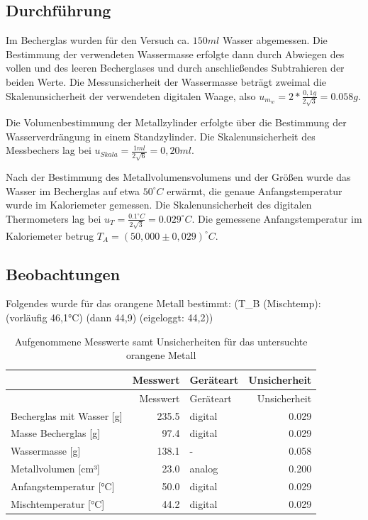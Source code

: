 \documentclass[
  9pt,
]{article}
\begin{document}
\hypertarget{durchfuxfchrung}{%
\subsection{Durchführung}\label{durchfuxfchrung}}

Im Becherglas wurden für den Versuch ca. \(150ml\) Wasser abgemessen.
Die Bestimmung der verwendeten Wassermasse erfolgte dann durch Abwiegen
des vollen und des leeren Becherglases und durch anschließendes
Subtrahieren der beiden Werte. Die Messunsicherheit der Wassermasse
beträgt zweimal die Skalenunsicherheit der verwendeten digitalen Waage,
also \(u_{m_w}=2*\frac{0,1g}{2\sqrt{3}}=0.058g\).

Die Volumenbestimmung der Metallzylinder erfolgte über die Bestimmung
der Wasserverdrängung in einem Standzylinder. Die Skalenunsicherheit des
Messbechers lag bei \(u_{Skala}=\frac{1ml}{2\sqrt{6}}=0,20ml\).

Nach der Bestimmung des Metallvolumensvolumens und der Größen wurde das
Wasser im Becherglas auf etwa \(50^\circ C\) erwärmt, die genaue
Anfangstemperatur wurde im Kaloriemeter gemessen. Die Skalenunsicherheit
des digitalen Thermometers lag bei
\(u_T = \frac{0.1^\circ C}{2\sqrt{3}} = 0.029^\circ C\). Die gemessene
Anfangstemperatur im Kaloriemeter betrug
\(T_A=(50,000\pm 0,029)^\circ C\).

\hypertarget{beobachtungen-1}{%
\subsection{Beobachtungen}\label{beobachtungen-1}}

Folgendes wurde für das orangene Metall bestimmt: (T\_B (Mischtemp):
(vorläufig 46,1°C) (dann 44,9) (eigeloggt: 44,2))

\begin{longtable}[]{@{}lrlr@{}}
\caption{Aufgenommene Messwerte samt Unsicherheiten für das untersuchte
orangene Metall}\tabularnewline
\toprule()
& Messwert & Geräteart & Unsicherheit \\
\midrule()
\endfirsthead
\toprule()
& Messwert & Geräteart & Unsicherheit \\
\midrule()
\endhead
Becherglas mit Wasser {[}g{]} & 235.5 & digital & 0.029 \\
Masse Becherglas {[}g{]} & 97.4 & digital & 0.029 \\
Wassermasse {[}g{]} & 138.1 & - & 0.058 \\
Metallvolumen {[}cm³{]} & 23.0 & analog & 0.200 \\
Anfangstemperatur {[}°C{]} & 50.0 & digital & 0.029 \\
Mischtemperatur {[}°C{]} & 44.2 & digital & 0.029 \\
\bottomrule()
\end{longtable}
\end{document}
